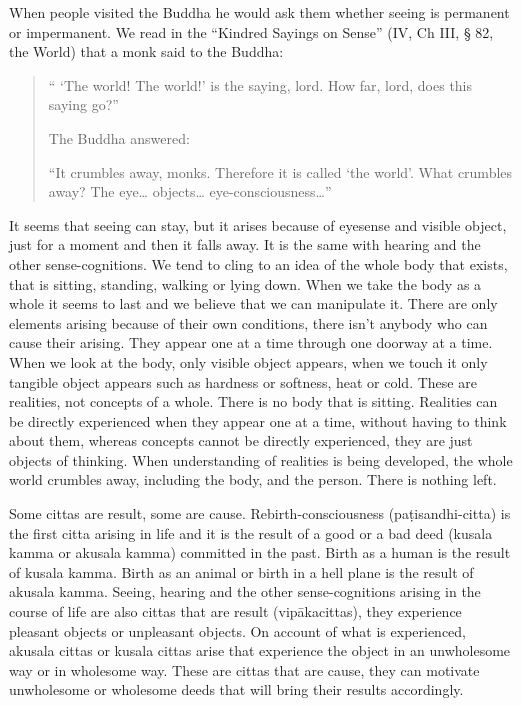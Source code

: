 When people visited the Buddha he would ask them whether seeing is
permanent or impermanent. We read in the ``Kindred Sayings on Sense''
(IV, Ch III, § 82, the World) that a monk said to the Buddha:

\begin{quote}
`` `The world! The world!' is the saying, lord. How far, lord, does this
saying go?''

The Buddha answered:

``It crumbles away, monks. Therefore it is called `the world'. What
crumbles away? The eye\ldots{} objects\ldots{}
eye-consciousness\ldots{}''
\end{quote}

It seems that seeing can stay, but it arises because of eyesense and
visible object, just for a moment and then it falls away. It is the same
with hearing and the other sense-cognitions. We tend to cling to an idea
of the whole body that exists, that is sitting, standing, walking or
lying down. When we take the body as a whole it seems to last and we
believe that we can manipulate it. There are only elements arising
because of their own conditions, there isn't anybody who can cause their
arising. They appear one at a time through one doorway at a time. When
we look at the body, only visible object appears, when we touch it only
tangible object appears such as hardness or softness, heat or cold.
These are realities, not concepts of a whole. There is no body that is
sitting. Realities can be directly experienced when they appear one at a
time, without having to think about them, whereas concepts cannot be
directly experienced, they are just objects of thinking. When
understanding of realities is being developed, the whole world crumbles
away, including the body, and the person. There is nothing left.

Some cittas are result, some are cause. Rebirth-consciousness
(paṭi\-sandhi-citta) is the first citta arising in life and it is the
result of a good or a bad deed (kusala kamma or akusala kamma) committed
in the past. Birth as a human is the result of kusala kamma. Birth as an
animal or birth in a hell plane is the result of akusala kamma. Seeing,
hearing and the other sense-cognitions arising in the course of life are
also cittas that are result (vipākacittas), they experience pleasant
objects or unpleasant objects. On account of what is experienced,
akusala cittas or kusala cittas arise that experience the object in an
unwholesome way or in wholesome way. These are cittas that are cause,
they can motivate unwholesome or wholesome deeds that will bring their
results accordingly.

